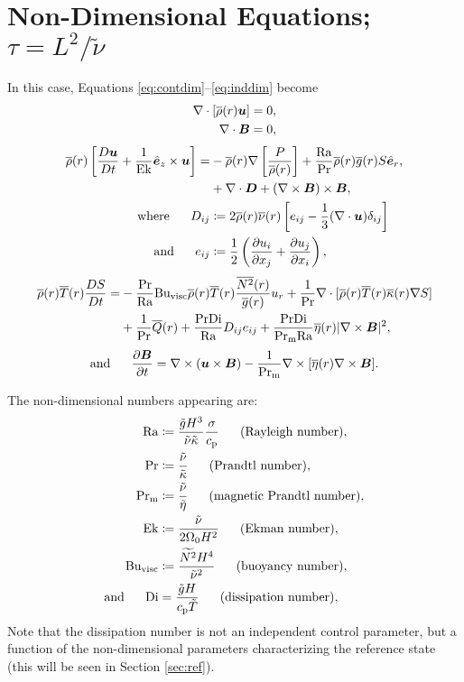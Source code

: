 \documentclass[12pt]{article}
\numberwithin{equation}{section}
\begin{document}
	\section{Non-Dimensional Equations; $\tau=L^2/\tilde{\nu}$}
	In this case, Equations \eqref{eq:contdim}--\eqref{eq:inddim} become 
	\begin{align}
	\nabla\cdot[\overline{\rho}(r)\bm{u}] &= 0\label{eq:contndvisc},\\
	\nabla\cdot \bm{B} &= 0,
\end{align}
\begin{subequations}\label{eq:momndvisc}
	\begin{align}
		\overline{\rho}(r)\left[\frac{D\bm{u}}{Dt}+\frac{1}{{\rm{Ek}}}\hat{\bm{e}}_z\times\bm{u}\right] = &-\overline{\rho}(r)\nabla\left[ \frac{P}{\overline{\rho}(r)} \right] + \frac{{\rm{Ra}}}{{\rm{Pr}}}\overline{\rho}(r)\overline{g}(r) S\hat{\bm{e}}_r, \nonumber\\
		&+\nabla\cdot\bm{D} +(\nabla\times\bm{B})\times\bm{B},\\
		\text{where}\ \ \ \ \  D_{ij} &\coloneqq 2\overline{\rho}(r)\overline{\nu}(r) \left[e_{ij} - \frac{1}{3}(\nabla\cdot\bm{u}) \delta_{ij} \right]\\
		\text{and}\ \ \ \ \  e_{ij} &\coloneqq \frac{1}{2}\left(\frac{\partial u_i}{\partial x_j} + \frac{\partial u_j}{\partial x_i} \right),
	\end{align}
\end{subequations}
\begin{align}\label{eq:enndvisc}
	\overline{\rho}(r)\overline{T}(r) \frac{DS}{Dt} = &- \frac{{\rm{Pr}}}{{\rm{Ra}}}{\rm{Bu_{visc}}}\overline{\rho}(r)\overline{T}(r) \frac{\overline{N^2}(r)}{\overline{g}(r)} u_r + \frac{1}{{\rm{Pr}}} \nabla\cdot[\overline{\rho}(r) \overline{T}(r) \overline{\kappa}(r) \nabla S] \nonumber \\
	&+ \frac{1}{{\rm{Pr}}} \overline{Q}(r) + \frac{{\rm{Pr}}{\rm{Di}}}{{\rm{Ra}}} D_{ij}e_{ij} + \frac{{\rm{Pr}}{\rm{Di}}}{{\rm{Pr_m}}{\rm{Ra}}} \overline{\eta}(r)|\nabla\times\bm{B}|^2,
\end{align}
\begin{align}\label{eq:indndvisc}
	\text{and}\ \ \ \ \  \frac{\partial\bm{B}}{\partial t} = \nabla\times(\bm{u}\times\bm{B}) - \frac{1}{{\rm{Pr_m}}} \nabla\times[\overline{\eta}(r)\nabla\times\bm{B}].
\end{align}	

The non-dimensional numbers appearing are:
\begin{subequations}
\begin{align}
	{\rm{Ra}} &\coloneqq \frac{\tilde{g} H^3}{\tilde{\nu} \tilde{\kappa}} \frac{\sigma}{c_{\rm{p}}}\ \ \ \ \ \text{(Rayleigh number)},\\ 
	{\rm{Pr}} &\coloneqq \frac{\tilde{\nu}}{\tilde{\kappa}}\ \ \ \ \ \text{(Prandtl number)},\\
	{\rm{Pr_m}} &\coloneqq \frac{\tilde{\nu}}{\tilde{\eta}}\ \ \ \ \ \text{(magnetic Prandtl number)},\\
	{\rm{Ek}} &\coloneqq \frac{\tilde{\nu}}{2\Omega_0H^2}\ \ \ \ \ \text{(Ekman number)},\\	
	{\rm{Bu_{visc}}} &\coloneqq \frac{\widetilde{N^2}H^4}{\tilde{\nu}^2}\ \ \ \ \ \text{(buoyancy number)},\\
	\text{and}\ \ \ \ \  {\rm{Di}} &= \frac{\tilde{g}H}{c_{\rm{p}}\tilde{T}}\ \ \ \ \ \text{(dissipation number)},
\end{align}
\end{subequations}
Note that the dissipation number is not an independent control parameter, but a function of the non-dimensional parameters characterizing the reference state (this will be seen in Section \ref{sec:ref}). 
\end{document}

